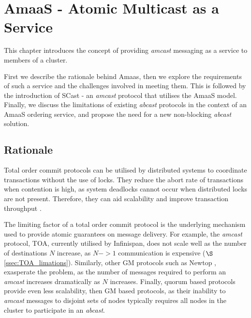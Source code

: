 \chapter{AmaaS - Atomic Multicast as a Service}\label{ch:amaas}

    \graphicspath{{Chapter3-TxService/Figs/Vector/}{Chapter3-TxService/Figs/}}

This chapter introduces the concept of providing \emph{amcast} messaging as a service to members of a cluster.

First we describe the rationale behind \textsf{Amaas}, then we explore the requirements of such a service and the challenges involved in meeting them.  This is followed by the introduction of \textsf{SCast} - an \emph{amcast} protocol that utilises the \textsf{AmaaS} model.  Finally, we discuss the limitations of existing \emph{abcast} protocols in the context of an \textsf{AmaaS} ordering service, and propose the need for a new non-blocking \emph{abcast} solution.  

\section{Rationale}
Total order commit protocols can be utilised by distributed systems to coordinate transactions without the use of locks.  They reduce the abort rate of transactions when contention is high, as system deadlocks cannot occur when distributed locks are not present.  Therefore, they can aid scalability and improve transaction throughput \citep{Ruivo:2011:ETO:2120967.2121604}.  

The limiting factor of a total order commit protocol is the underlying mechanism used to provide atomic guarantees on message delivery.  For example, the \emph{amcast} protocol, TOA, currently utilised by Infinispan, does not scale well as the number of destinations $N$ increase, as $N->1$ communication is expensive ($\S$ \ref{ssec:TOA_limations}).  Similarly, other GM protocols such as Newtop \citep{Ezhilchelvan:1995:NFG:876885.880005}, exasperate the problem, as the number of messages required to perform an \emph{amcast} increases dramatically as $N$ increases.  Finally, quorum based protocols provide even less scalability, then GM based protocols, as their inability to \emph{amcast} messages to disjoint sets of nodes typically requires all nodes in the cluster to participate in an \emph{abcast}.  

